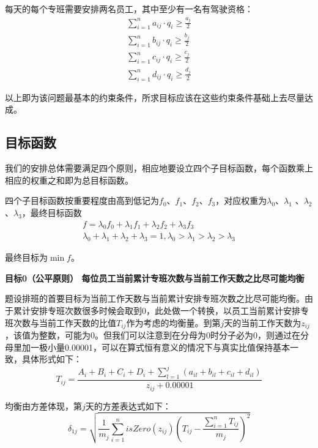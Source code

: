 \documentclass{article}
\begin{document}
	每天的每个专班需要安排两名员工，其中至少有一名有驾驶资格：
	\begin{gather}
		\sum_{i=1}^{n}a_{ij}\cdot q_i \geq \frac{a_j}{2}\\
		\sum_{i=1}^{n}b_{ij}\cdot q_i \geq \frac{b_j}{2}\\
		\sum_{i=1}^{n}c_{ij}\cdot q_i \geq \frac{c_j}{2}\\
		\sum_{i=1}^{n}d_{ij}\cdot q_i \geq \frac{d_j}{2}
	\end{gather}
	
	以上即为该问题最基本的约束条件，所求目标应该在这些约束条件基础上去尽量达成。
	\subsection{目标函数}
	我们的安排总体需要满足四个原则，相应地要设立四个子目标函数，每个函数乘上相应的权重之和即为总目标函数。
	
	四个子目标函数按重要程度由高到低记为$f_0$、$f_1$、$f_2$、$f_3$，对应权重为$\lambda_{0}$、$\lambda_{1}$ 、$\lambda_{2}$、$\lambda_{3}$，最终目标函数
	\begin{gather}
		f=\lambda_0 f_0+\lambda_1 f_1+\lambda_2 f_2+\lambda_3 f_3\\
		\lambda_0+\lambda_1+\lambda_2+\lambda_3=1,\lambda_0>\lambda_1>\lambda_2>\lambda_3
	\end{gather}
	
	最终目标为$\min f$。
	
	\newpage
	\textbf{目标0（公平原则）\quad 
		每位员工当前累计专班次数与当前工作天数之比尽可能均衡}
	
	题设排班的首要目标为当前工作天数与当前累计安排专班次数之比尽可能均衡。由于累计安排专班次数很多时候会取到0，此处做一个转换，以员工当前累计安排专班次数与当前工作天数的比值$T_{ij}$作为考虑的均衡量。到第$j$天的当前工作天数为$z_{ij}$，该值为整数，可能为0。但我们可以注意到在分母为0时分子必为0，则通过在分母里加一极小量0.00001，可以在算式恒有意义的情况下与真实比值保持基本一致，具体形式如下：
	\begin{equation}
		T_{ij}=\frac{A_i+B_i+C_i+D_i+\sum_{l=1}^{j}(a_{il}+b_{il}+c_{il}+d_{il})}{z_{ij}+0.00001}
	\end{equation}
	
	均衡由方差体现，第$j$天的方差表达式如下：
	\begin{equation}
		\delta_{1j}=\sqrt{\frac{1}{m_j}\sum_{i=1}^{n}isZero(z_{ij})(T_{ij}-\frac{\sum_{i=1}^{n}T_{ij}}{m_{j}})^2}
	\end{equation}
	
\end{document}
